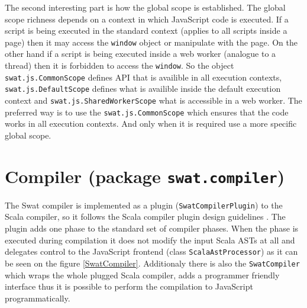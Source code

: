 \documentclass[12pt,a4paper]{report}
\begin{document}
The second interesting part is how the global scope is established. The global scope richness depends on a context in which JavaScript code is executed. If a script is being executed in the standard context (applies to all scripts inside a page) then it may access the \texttt{window} object or manipulate with the page. On the other hand if a script is being executed inside a web worker (analogue to a thread) then it is forbidden to access the \texttt{window}. So the object \texttt{swat.js.CommonScope} defines API that is availible in all execution contexts, \texttt{swat.js.DefaultScope} defines what is availible inside the default execution context and \texttt{swat.js.SharedWorkerScope} what is accessible in a web worker. The preferred way is to use the \texttt{swat.js.CommonScope} which ensures that the code works in all execution contexts. And only when it is required use a more specific global scope.

\section{Compiler (package \texttt{swat.compiler})}

The Swat compiler is implemented as a plugin (\texttt{SwatCompilerPlugin}) to the Scala compiler, so it follows the Scala compiler plugin design guidelines \cite{CompilerPlugins}. The plugin adds one phase to the standard set of compiler phases. When the phase is executed during compilation it does not modify the input Scala ASTs at all and delegates control to the JavaScript frontend (class \texttt{ScalaAstProcessor}) as it can be seen on the figure \ref{SwatCompiler}. Additionaly there is also the \texttt{SwatCompiler} which wraps the whole plugged Scala compiler, adds a programmer friendly interface thus it is possible to perform the compilation to JavaScript programmatically.
\end{document}
